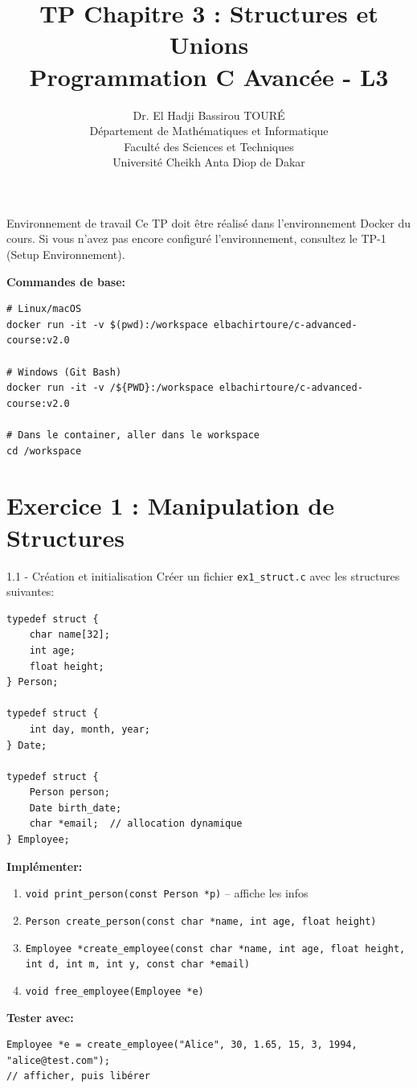 \documentclass[10pt,a4paper]{article}
\title{\textbf{TP Chapitre 3 : Structures et Unions}\\
\large Programmation C Avancée - L3}
\author{Dr. El Hadji Bassirou TOURÉ\\
Département de Mathématiques et Informatique\\
Faculté des Sciences et Techniques\\
Université Cheikh Anta Diop de Dakar}
\date{}
\begin{document}
\maketitle

\begin{infobox}{Environnement de travail}
Ce TP doit être réalisé dans l'environnement Docker du cours. 
Si vous n'avez pas encore configuré l'environnement, consultez le TP-1 (Setup Environnement).

\textbf{Commandes de base:}
\begin{verbatim}
# Linux/macOS
docker run -it -v $(pwd):/workspace elbachirtoure/c-advanced-course:v2.0

# Windows (Git Bash)
docker run -it -v /${PWD}:/workspace elbachirtoure/c-advanced-course:v2.0

# Dans le container, aller dans le workspace
cd /workspace
\end{verbatim}
\end{infobox}

\section{Exercice 1 : Manipulation de Structures}

\begin{exercicebox}{1.1 - Création et initialisation}
Créer un fichier \texttt{ex1\_struct.c} avec les structures suivantes:

\begin{lstlisting}
typedef struct {
    char name[32];
    int age;
    float height;
} Person;

typedef struct {
    int day, month, year;
} Date;

typedef struct {
    Person person;
    Date birth_date;
    char *email;  // allocation dynamique
} Employee;
\end{lstlisting}

\textbf{Implémenter:}
\begin{enumerate}
\item \texttt{void print\_person(const Person *p)} -- affiche les infos
\item \texttt{Person create\_person(const char *name, int age, float height)}
\item \texttt{Employee *create\_employee(const char *name, int age, float height, int d, int m, int y, const char *email)}
\item \texttt{void free\_employee(Employee *e)}
\end{enumerate}

\textbf{Tester avec:}
\begin{lstlisting}
Employee *e = create_employee("Alice", 30, 1.65, 15, 3, 1994, "alice@test.com");
// afficher, puis libérer
\end{lstlisting}
\end{exercicebox}
\end{document}
